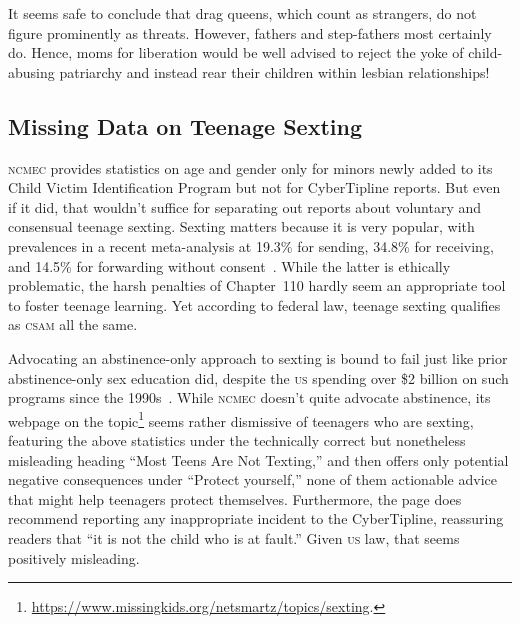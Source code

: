 \documentclass[nonacm,screen]{acmart}
\newcommand\V[1]{\textsc{\MakeLowercase{#1}}}
\begin{document}
\begin{itemize}
{It seems safe to conclude that drag queens, which count as strangers, do not
figure prominently as threats. However, fathers and step-fathers most certainly
do. Hence, moms for liberation would be well advised to reject the yoke of
child-abusing patriarchy and instead rear their children within lesbian
relationships!


\subsection{Missing Data on Teenage Sexting}

\V{NCMEC} provides statistics on age and gender only for minors newly added to
its Child Victim Identification Program but not for CyberTipline reports. But
even if it did, that wouldn't suffice for separating out reports about voluntary
and consensual teenage sexting. Sexting matters because it is very popular, with
prevalences in a recent meta-analysis at 19.3\% for sending, 34.8\% for
receiving, and 14.5\% for forwarding without consent~\cite{MoriParkea2022}.
While the latter is ethically problematic, the harsh penalties of Chapter~110
hardly seem an appropriate tool to foster teenage learning. Yet according to
federal law, teenage sexting qualifies as \V{CSAM} all the same.

Advocating an abstinence-only approach to sexting is bound to fail just like
prior abstinence-only sex education did, despite the \V{US} spending over \$2
billion on such programs since the 1990s~\cite{FoxHimmelsteinea2019}. While
\V{NCMEC} doesn't quite advocate abstinence, its webpage on the
topic\footnote{\url{https://www.missingkids.org/netsmartz/topics/sexting}.}
seems rather dismissive of teenagers who are sexting, featuring the above
statistics under the technically correct but nonetheless misleading heading
``Most Teens Are Not Texting,'' and then offers only potential negative
consequences under ``Protect yourself,'' none of them actionable advice that
might help teenagers protect themselves. Furthermore, the page does recommend
reporting any inappropriate incident to the CyberTipline, reassuring readers
that ``it is not the child who is at fault.'' Given \V{US} law, that seems
positively misleading.

}
\end{itemize}
\end{document}
